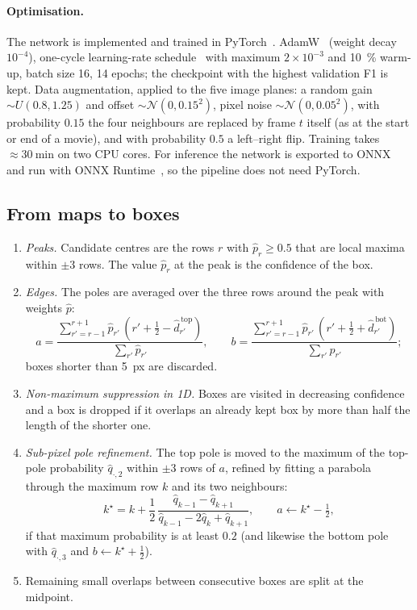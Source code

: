 \documentclass[11pt,a4paper]{article}
\newcommand{\hatp}{\hat p}
\begin{document}
\paragraph{Optimisation.} The network is implemented and trained in PyTorch~\cite{paszke2019}. AdamW~\cite{loshchilov2019} (weight decay $10^{-4}$), one-cycle learning-rate schedule~\cite{smith2019} with maximum $2\times10^{-3}$ and \SI{10}{\percent} warm-up, batch size 16, 14 epochs; the checkpoint with the highest validation F1 is kept. Data augmentation, applied to the five image planes: a random gain $\sim U(0.8,1.25)$ and offset $\sim\mathcal N(0,0.15^2)$, pixel noise $\sim\mathcal N(0,0.05^2)$, with probability $0.15$ the four neighbours are replaced by frame $t$ itself (as at the start or end of a movie), and with probability $0.5$ a left--right flip. Training takes $\approx\SI{30}{\minute}$ on two CPU cores. For inference the network is exported to ONNX~\cite{onnx} and run with ONNX Runtime~\cite{onnxruntime}, so the pipeline does not need PyTorch.

\subsection{From maps to boxes}\label{sec:decode}
\begin{enumerate}
\item \emph{Peaks.} Candidate centres are the rows $r$ with $\hatp_r\ge0.5$ that are local maxima within $\pm3$ rows. The value $\hatp_r$ at the peak is the confidence of the box.
\item \emph{Edges.} The poles are averaged over the three rows around the peak with weights $\hatp$:
\begin{equation}
a=\frac{\sum_{r'=r-1}^{r+1}\hatp_{r'}\,(r'+\tfrac12-\hat d^{\,\mathrm{top}}_{r'})}{\sum_{r'}\hatp_{r'}},\qquad
b=\frac{\sum_{r'=r-1}^{r+1}\hatp_{r'}\,(r'+\tfrac12+\hat d^{\,\mathrm{bot}}_{r'})}{\sum_{r'}\hatp_{r'}};
\end{equation}
boxes shorter than \SI{5}{px} are discarded.
\item \emph{Non-maximum suppression in 1D.} Boxes are visited in decreasing confidence and a box is dropped if it overlaps an already kept box by more than half the length of the shorter one.
\item \emph{Sub-pixel pole refinement.} The top pole is moved to the maximum of the top-pole probability $\hat q_{\cdot,2}$ within $\pm3$ rows of $a$, refined by fitting a parabola through the maximum row $k$ and its two neighbours:
\begin{equation}
k^\star=k+\frac{1}{2}\,\frac{\hat q_{k-1}-\hat q_{k+1}}{\hat q_{k-1}-2\hat q_k+\hat q_{k+1}},\qquad a\leftarrow k^\star-\tfrac12,
\end{equation}
if that maximum probability is at least $0.2$ (and likewise the bottom pole with $\hat q_{\cdot,3}$ and $b\leftarrow k^\star+\tfrac12$).
\item Remaining small overlaps between consecutive boxes are split at the midpoint.
\end{enumerate}
\end{document}
